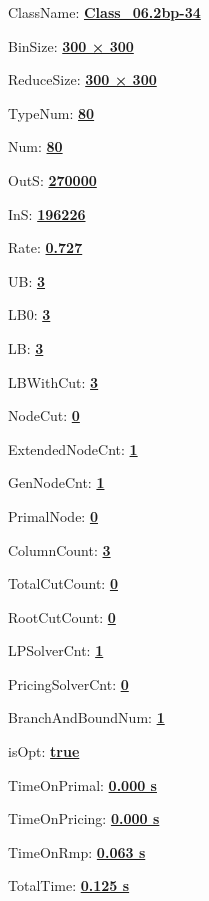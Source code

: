 \documentclass[11pt]{article}
\begin{document}
\pagestyle{empty}


ClassName: \underline{\textbf{Class_06.2bp-34}}
\par
BinSize: \underline{\textbf{300 × 300}}
\par
ReduceSize: \underline{\textbf{300 × 300}}
\par
TypeNum: \underline{\textbf{80}}
\par
Num: \underline{\textbf{80}}
\par
OutS: \underline{\textbf{270000}}
\par
InS: \underline{\textbf{196226}}
\par
Rate: \underline{\textbf{0.727}}
\par
UB: \underline{\textbf{3}}
\par
LB0: \underline{\textbf{3}}
\par
LB: \underline{\textbf{3}}
\par
LBWithCut: \underline{\textbf{3}}
\par
NodeCut: \underline{\textbf{0}}
\par
ExtendedNodeCnt: \underline{\textbf{1}}
\par
GenNodeCnt: \underline{\textbf{1}}
\par
PrimalNode: \underline{\textbf{0}}
\par
ColumnCount: \underline{\textbf{3}}
\par
TotalCutCount: \underline{\textbf{0}}
\par
RootCutCount: \underline{\textbf{0}}
\par
LPSolverCnt: \underline{\textbf{1}}
\par
PricingSolverCnt: \underline{\textbf{0}}
\par
BranchAndBoundNum: \underline{\textbf{1}}
\par
isOpt: \underline{\textbf{true}}
\par
TimeOnPrimal: \underline{\textbf{0.000 s}}
\par
TimeOnPricing: \underline{\textbf{0.000 s}}
\par
TimeOnRmp: \underline{\textbf{0.063 s}}
\par
TotalTime: \underline{\textbf{0.125 s}}
\par
\newpage
\end{document}
